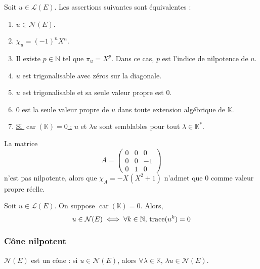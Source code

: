   \begin{theorem}
    \label{156-1}
    Soit $u \in \mathcal{L}(E)$. Les assertions suivantes sont équivalentes :
    \begin{enumerate}[label=(\roman*)]
      \item $u \in \mathcal{N}(E)$.
      \item $\chi_u = (-1)^n X^n$.
      \item Il existe $p \in \mathbb{N}$ tel que $\pi_u = X^p$. Dans ce cas, $p$ est l'indice de nilpotence de $u$.
      \item $u$ est trigonalisable avec zéros sur la diagonale.
      \item $u$ est trigonalisable et sa seule valeur propre est $0$.
      \item $0$ est la seule valeur propre de $u$ dans toute extension algébrique de $\mathbb{K}$.
      \item \underline{Si $\operatorname{car}(\mathbb{K}) = 0$ :} $u$ et $\lambda u$ sont semblables pour tout $\lambda \in \mathbb{K}^*$.
    \end{enumerate}
  \end{theorem}

  \begin{cexample}
    La matrice
    \[
      A = \begin{pmatrix}
        0 & 0 & 0 \\
        0 & 0 & -1 \\
        0 & 1 & 0
      \end{pmatrix}
    \]
    n'est pas nilpotente, alors que $\chi_A = -X(X^2 + 1)$ n'admet que $0$ comme valeur propre réelle.
  \end{cexample}

  \begin{proposition}
    Soit $u \in \mathcal{L}(E)$. On suppose $\operatorname{car}(\mathbb{K}) = 0$. Alors,
    \[ u \in \mathcal{N}(E) \iff \forall k \in \mathbb{N}, \, \operatorname{trace}(u^k) = 0 \]
  \end{proposition}

  \subsubsection{Cône nilpotent}

  \begin{proposition}
    $\mathcal{N}(E)$ est un cône : si $u \in \mathcal{N}(E)$, alors $\forall \lambda \in \mathbb{K}, \, \lambda u \in \mathcal{N}(E)$.
  \end{proposition}

